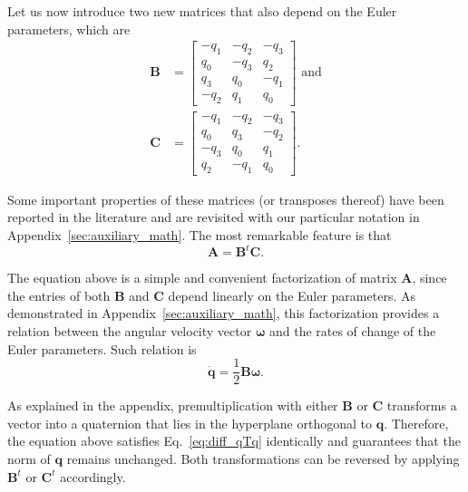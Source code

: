 \documentclass[aip,jcp,reprint,amsmath,amssymb,amsfont]{revtex4-1}
\newcommand{\mt}[1]{\boldsymbol{\mathbf{#1}}}           %
\newcommand{\vt}[1]{\boldsymbol{\mathbf{#1}}}           %
\newcommand{\tr}[1]{#1^t}                               %
\begin{document}
Let us now introduce two new matrices that also depend on the Euler parameters, which are
\begin{subequations}
\label{eq:def_B_and_C}
\begin{align}
\mt B &= \left[
\begin{array}{rrrr}
-q_1 & -q_2 & -q_3 \\
 q_0 & -q_3 &  q_2 \\
 q_3 &  q_0 & -q_1 \\
-q_2 &  q_1 &  q_0
\end{array}
\right] \text{ and} \label{eq:def_B} \\
\mt C &= \left[
\begin{array}{rrrr}
-q_1 & -q_2 & -q_3 \\
 q_0 &  q_3 & -q_2 \\
-q_3 &  q_0 &  q_1 \\
 q_2 & -q_1 &  q_0
\end{array}
\right].
\end{align}
\end{subequations}

Some important properties of these matrices (or transposes thereof) have been reported in the literature\cite{Haug1989, Shuster1993, Dichmann1999, Ravishankar2004, Nielsen2012} and are revisited with our particular notation in Appendix~\ref{sec:auxiliary_math}. The most remarkable feature is that
\begin{equation}
\label{eq:factorization_of_A}
{\mt A} = \tr{\mt B}{\mt C}.
\end{equation}

The equation above is a simple and convenient factorization of matrix $\mt A$, since the entries of both $\mt B$ and $\mt C$ depend linearly on the Euler parameters. As demonstrated in Appendix~\ref{sec:auxiliary_math}, this factorization provides a relation between the angular velocity vector $\vt \omega$ and the rates of change of the Euler parameters. Such relation is
\begin{equation}
\label{eq:relation_qdot_omega}
\dot{\vt q} = \frac{1}{2} \mt B \vt \omega.
\end{equation}

As explained in the appendix, premultiplication with either $\mt B$ or $\mt C$ transforms a vector into a quaternion that lies in the hyperplane orthogonal to $\vt q$. Therefore, the equation above satisfies Eq.~\ref{eq:diff_qTq} identically and guarantees that the norm of $\vt q$ remains unchanged. Both transformations can be reversed by applying $\tr{\vt B}$ or $\tr{\vt C}$ accordingly.
\end{document}
